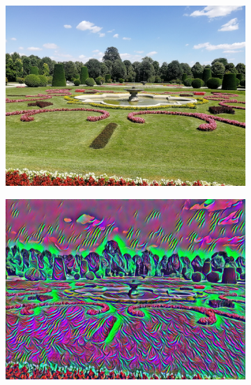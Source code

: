 \begin{figure}[H]
    \begin{subfigure}[h]{0.32\textwidth}
        \centering
        \includegraphics[width=\textwidth]{resources/content/content/garden.jpg}
    \end{subfigure}
    \begin{subfigure}[h]{0.32\textwidth}
        \centering
        \includegraphics[width=\textwidth]{resources/content/experiments/garden-vgg16_multicolored_abstract_artwork.jpg}
    \end{subfigure}
    \begin{subfigure}[h]{0.32\textwidth}
        \centering

\end{subfigure}
\end{figure}
